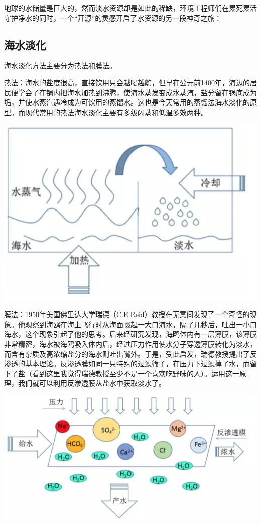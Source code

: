\documentclass[
]{book}
\begin{document}
地球的水储量是巨大的，然而淡水资源却是如此的稀缺，环境工程师们在累死累活守护净水的同时，一个``开源''的灵感开启了水资源的另一段神奇之旅：

\hypertarget{ux6d77ux6c34ux6de1ux5316}{%
\subsection{海水淡化}\label{ux6d77ux6c34ux6de1ux5316}}

海水淡化方法主要分为热法和膜法。

热法：海水的盐度很高，直接饮用只会越喝越齁，但早在公元前1400年，海边的居民便学会了在锅内把海水加热到沸腾，使海水蒸发变成水蒸汽，盐分留在锅底成为垢，并使水蒸汽遇冷成为可饮用的蒸馏水。这也是今天常用的蒸馏法海水淡化的原型。而现代常用的热法海水淡化主要有多级闪蒸和低温多效两种。

\includegraphics[width=8.33in]{images/seawater1}

膜法：1950年美国佛里达大学瑞德（C.E.Reid）教授在无意间发现了一个奇怪的现象。他观察到海鸥在海上飞行时从海面啜起一大口海水，隔了几秒后，吐出一小口海水，这个现象引起了他的思考。后来经研究发现，海鸥体内有一层薄膜，该薄膜非常精密，海水被海鸥吸入体内后，经过压力作用使水分子穿透薄膜转化为淡水，而含有杂质及高浓缩盐分的海水则吐出嘴外。于是，受此启发，瑞德教授提出了反渗透的基本理论。反渗透膜如同一只特殊的过滤筛子，在压力下过滤掉了水，而留下了盐（看到这里我觉得瑞德教授至少不是一个喜欢吃野味的人）。运用这一原理，我们就可以利用反渗透膜从盐水中获取淡水了。

\includegraphics[width=8.33in]{images/seawater2}
\end{document}
